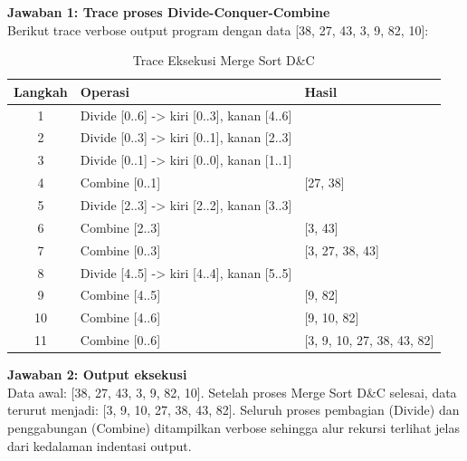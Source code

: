 \textbf{Jawaban 1: Trace proses Divide-Conquer-Combine}\\
Berikut trace verbose output program dengan data [38, 27, 43, 3, 9, 82, 10]:

\begin{table}[H]
    \centering
    \caption{Trace Eksekusi Merge Sort D\&C}
    \begin{tabular}{cll}
    \toprule
    \textbf{Langkah} & \textbf{Operasi} & \textbf{Hasil} \\ \midrule
    1 & Divide [0..6] -> kiri [0..3], kanan [4..6] & \\
    2 & Divide [0..3] -> kiri [0..1], kanan [2..3] & \\
    3 & Divide [0..1] -> kiri [0..0], kanan [1..1] & \\
    4 & Combine [0..1] & [27, 38] \\
    5 & Divide [2..3] -> kiri [2..2], kanan [3..3] & \\
    6 & Combine [2..3] & [3, 43] \\
    7 & Combine [0..3] & [3, 27, 38, 43] \\
    8 & Divide [4..5] -> kiri [4..4], kanan [5..5] & \\
    9 & Combine [4..5] & [9, 82] \\
    10 & Combine [4..6] & [9, 10, 82] \\
    11 & Combine [0..6] & [3, 9, 10, 27, 38, 43, 82] \\ \bottomrule
    \end{tabular}
\end{table}

\textbf{Jawaban 2: Output eksekusi}\\
Data awal: [38, 27, 43, 3, 9, 82, 10]. Setelah proses Merge Sort D\&C selesai, data terurut menjadi: [3, 9, 10, 27, 38, 43, 82]. Seluruh proses pembagian (Divide) dan penggabungan (Combine) ditampilkan verbose sehingga alur rekursi terlihat jelas dari kedalaman indentasi output.